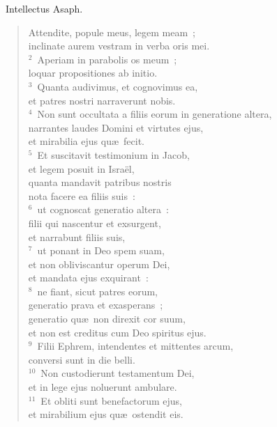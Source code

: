 ~\lettrine[lines=10,image=true,loversize=0.05,lraise=-0.03]{I}{}ntellectus Asaph. \begin{flushleft}\begin{verse}\vspace{6pt}Attendite, popule meus, legem meam~;\\ inclinate aurem vestram in verba oris mei.\\
${}^{2}$~Aperiam in parabolis os meum~;\\ loquar propositiones ab initio.\\
${}^{3}$~Quanta audivimus, et cognovimus ea,\\ et patres nostri narraverunt nobis.\\
${}^{4}$~Non sunt occultata a filiis eorum in generatione altera,\\ narrantes laudes Domini et virtutes ejus,\\ et mirabilia ejus qu\ae\ fecit.\\
${}^{5}$~Et suscitavit testimonium in Jacob,\\ et legem posuit in Isra\"el,\\ quanta mandavit patribus nostris\\ nota facere ea filiis suis~:\\
${}^{6}$~ut cognoscat generatio altera~:\\ filii qui nascentur et exsurgent,\\ et narrabunt filiis suis,\\
${}^{7}$~ut ponant in Deo spem suam,\\ et non obliviscantur operum Dei,\\ et mandata ejus exquirant~:\\
${}^{8}$~ne fiant, sicut patres eorum,\\ generatio prava et exasperans~;\\ generatio qu\ae\ non direxit cor suum,\\ et non est creditus cum Deo spiritus ejus.\\
${}^{9}$~Filii Ephrem, intendentes et mittentes arcum,\\ conversi sunt in die belli.\\
${}^{10}$~Non custodierunt testamentum Dei,\\ et in lege ejus noluerunt ambulare.\\
${}^{11}$~Et obliti sunt benefactorum ejus,\\ et mirabilium ejus qu\ae\ ostendit eis.\\

\end{verse}
\end{flushleft}
